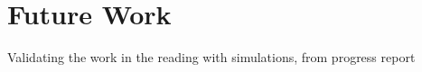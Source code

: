 \chapter{Future Work} \label{Chapter:eight}
Validating the work in the reading with simulations, from progress report
